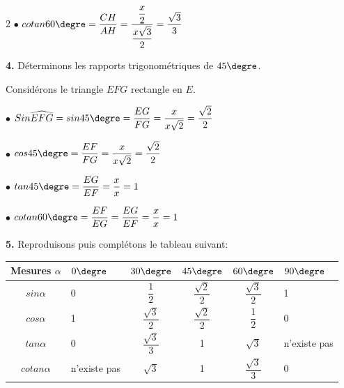 \begin{multicols*}{2}
  	$\bullet$ $cotan60\textrm{\degre}=\dfrac{CH}{AH}=\dfrac{\dfrac{x}{2}}{\dfrac{x\sqrt{3}}{2}}=\dfrac{\sqrt{3}}{3}$\vspace{0.3cm}
  	
  	\textbf{4.} Déterminons les rapports trigonométriques de $45\textrm{\degre}$.
  	
  	Considérons le triangle $EFG$ rectangle en $E$.\vspace{0.3cm}
  	
  	$\bullet$ $Sin\widehat{EFG}=sin45\textrm{\degre}=\dfrac{EG}{FG}=\dfrac{x}{x\sqrt{2}}=\dfrac{\sqrt{2}}{2}$\vspace{0.3cm}
  	
  	$\bullet$ $cos45\textrm{\degre}=\dfrac{EF}{FG}=\dfrac{x}{x\sqrt{2}}=\dfrac{\sqrt{2}}{2}$\vspace{0.3cm}
  	
  	$\bullet$ $tan45\textrm{\degre}=\dfrac{EG}{EF}=\dfrac{x}{x}=1$\vspace{0.3cm}
  	
  	$\bullet$ $cotan60\textrm{\degre}=\dfrac{EF}{EG}=\dfrac{EG}{EF}=\dfrac{x}{x}=1$\vspace{0.3cm}
  	
  	\textbf{5.} Reproduisons puis complétons le tableau suivant:
  	
  	\begin{tabular}{|c|p{1cm}|c|c|c|p{1cm}|}
  		\hline
  		Mesures $\alpha$	&$0\textrm{\degre}$  &$30\textrm{\degre}$  & $45\textrm{\degre}$ &$60\textrm{\degre}$  & $90\textrm{\degre}$ \\
  		\hline
  		$sin\alpha$	& 0 &$\dfrac{1}{2}$  & $\dfrac{\sqrt{2}}{2}$ & $\dfrac{\sqrt{3}}{2}$ &1  \\
  		\hline
  		$cos\alpha$	& 1 &$\dfrac{\sqrt{3}}{2}$  &$\dfrac{\sqrt{2}}{2}$  & $\dfrac{1}{2}$ & 0 \\
  		\hline
  		$tan\alpha$	&0  & $\dfrac{\sqrt{3}}{3}$ & 1 &$\sqrt{3}$  &  n'existe pas  \\
  		\hline
  		$cotan\alpha$	&n'existe pas  &$\sqrt{3}$  & 1 & $\dfrac{\sqrt{3}}{3}$ & 0 \\
  		\hline
  	\end{tabular}
  	

\end{multicols*}
